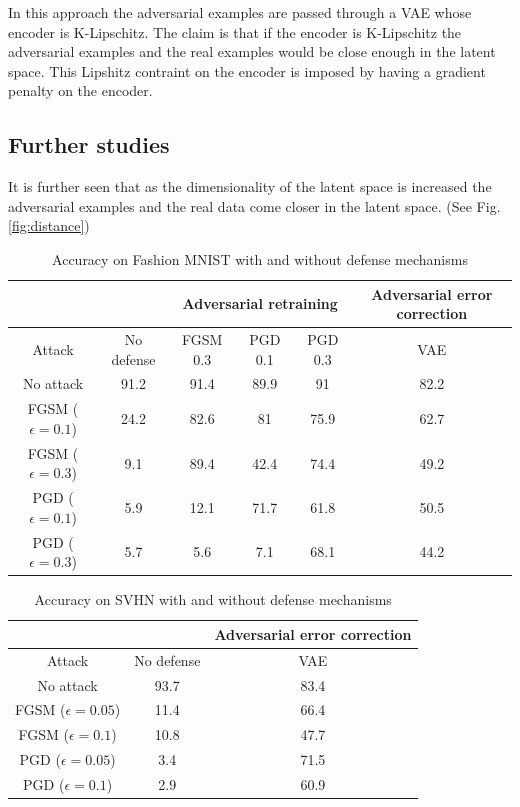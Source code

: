 \documentclass[journal]{IEEEtran}
\begin{document}
In this approach the adversarial examples are passed through a VAE whose encoder is K-Lipschitz. The claim is that if the encoder is K-Lipschitz the adversarial examples and the real examples would be close enough in the latent space. This Lipshitz contraint on the encoder is imposed by having a gradient penalty on the encoder.

\subsection{Further studies}
It is further seen that as the dimensionality of the latent space is increased the adversarial examples and the real data come closer in the latent space. (See Fig. \ref{fig:distance})

\begin{table}[t]
	\caption{Accuracy on Fashion MNIST with and without defense mechanisms}
	\centering
	\begin{tabular}{c|c|ccc|c}
		\toprule
		& & \multicolumn{3}{c|}{Adversarial retraining} & Adversarial error correction
		\\
		\midrule
		Attack & No defense & FGSM 0.3 & PGD 0.1 & PGD 0.3 & VAE
		\\
		\midrule
		No attack & 91.2 & 91.4 & 89.9 & 91 & 82.2
		\\
		FGSM ($\epsilon = 0.1$) & 24.2 & 82.6 & 81 & 75.9 & 62.7
		\\
		FGSM ($\epsilon = 0.3$) & 9.1 & 89.4 & 42.4 & 74.4 & 49.2
		\\
		PGD ($\epsilon = 0.1$) & 5.9 & 12.1 & 71.7 & 61.8 & 50.5
		\\
		PGD ($\epsilon = 0.3$) & 5.7 & 5.6 & 7.1 & 68.1 & 44.2
		\\
		\bottomrule
	\end{tabular}
	\label{tab: cnnconv}
\end{table}

\begin{table}[t]
	\caption{Accuracy on SVHN with and without defense mechanisms}
	\centering
	\begin{tabular}{c|c|c}
		\toprule
		& & Adversarial error correction
		\\
		\midrule
		Attack & No defense & VAE
		\\
		\midrule
		No attack & 93.7 & 83.4
		\\
		FGSM ($\epsilon = 0.05$) & 11.4 & 66.4
		\\
		FGSM ($\epsilon = 0.1$) & 10.8 & 47.7
		\\
		PGD ($\epsilon = 0.05$) & 3.4 & 71.5
		\\
		PGD ($\epsilon = 0.1$) & 2.9 & 60.9
		\\
		\bottomrule
	\end{tabular}
	\label{tab: cnnconv}
\end{table}
\end{document}
